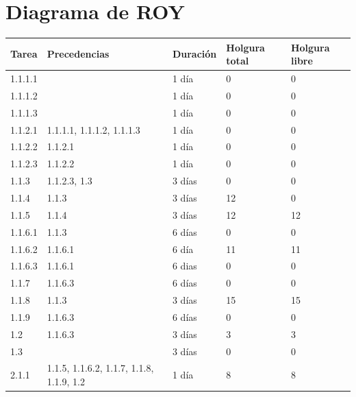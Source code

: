 \documentclass{report}
\begin{document}
        \clearpage\section{Diagrama de ROY}
            \label{roy}
            \begin{longtable}{|p{3cm}|p{3cm}|p{3cm}|p{3cm}|p{3cm}|}
                \hline
                \textbf{Tarea} & \textbf{Precedencias} & \textbf{Duración} & \textbf{Holgura total} & \textbf{Holgura libre}\\
                \hline
                \hline
                1.1.1.1 & & 1 día & 0 & 0\\
                \hline
                1.1.1.2 & & 1 día & 0 & 0\\
                \hline
                1.1.1.3 & & 1 día & 0 & 0\\
                \hline
                1.1.2.1 & 1.1.1.1, 1.1.1.2, 1.1.1.3 & 1 día & 0 & 0\\
                \hline
                1.1.2.2 & 1.1.2.1 & 1 día & 0 & 0\\
                \hline
                1.1.2.3 & 1.1.2.2 & 1 día & 0 & 0\\
                \hline
                1.1.3 & 1.1.2.3, 1.3 & 3 días & 0 & 0\\
                \hline
                1.1.4 & 1.1.3 & 3 días & 12 & 0\\
                \hline
                1.1.5 & 1.1.4 & 3 días & 12 & 12\\
                \hline
                1.1.6.1 & 1.1.3 & 6 días & 0 & 0\\
                \hline
                1.1.6.2 & 1.1.6.1 & 6 día & 11 & 11\\
                \hline
                1.1.6.3 & 1.1.6.1 & 6 dias & 0 & 0\\
                \hline
                1.1.7 & 1.1.6.3 & 6 días & 0 & 0\\
                \hline
                1.1.8 & 1.1.3 & 3 días & 15 & 15\\
                \hline
                1.1.9 & 1.1.6.3 & 6 días & 0 & 0\\
                \hline
                1.2 & 1.1.6.3 & 3 días & 3 & 3\\
                \hline
                1.3 & & 3 días & 0 & 0\\
                \hline
                2.1.1 & 1.1.5, 1.1.6.2, 1.1.7, 1.1.8, 1.1.9, 1.2 & 1 día & 8 & 8\\

\end{longtable}
\end{document}
